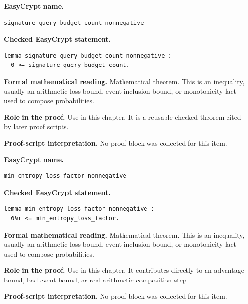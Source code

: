 \begin{formaltheorem}
\noindent\textbf{EasyCrypt name.}
\begin{lstlisting}[language=EasyCrypt,basicstyle=\ttfamily\scriptsize]
signature_query_budget_count_nonnegative
\end{lstlisting}
\noindent\textbf{Checked EasyCrypt statement.}
\begin{lstlisting}[language=EasyCrypt,basicstyle=\ttfamily\scriptsize]
lemma signature_query_budget_count_nonnegative :
  0 <= signature_query_budget_count.
\end{lstlisting}
\noindent\textbf{Formal mathematical reading.}
Mathematical theorem. This is an inequality, usually an arithmetic loss bound, event inclusion bound, or monotonicity fact used to compose probabilities.

\noindent\textbf{Role in the proof.}
Use in this chapter. It is a reusable checked theorem cited by later proof scripts.

\noindent\textbf{Proof-script interpretation.}
No proof block was collected for this item.

\end{formaltheorem}

\begin{formaltheorem}
\noindent\textbf{EasyCrypt name.}
\begin{lstlisting}[language=EasyCrypt,basicstyle=\ttfamily\scriptsize]
min_entropy_loss_factor_nonnegative
\end{lstlisting}
\noindent\textbf{Checked EasyCrypt statement.}
\begin{lstlisting}[language=EasyCrypt,basicstyle=\ttfamily\scriptsize]
lemma min_entropy_loss_factor_nonnegative :
  0%r <= min_entropy_loss_factor.
\end{lstlisting}
\noindent\textbf{Formal mathematical reading.}
Mathematical theorem. This is an inequality, usually an arithmetic loss bound, event inclusion bound, or monotonicity fact used to compose probabilities.

\noindent\textbf{Role in the proof.}
Use in this chapter. It contributes directly to an advantage bound, bad-event bound, or real-arithmetic composition step.

\noindent\textbf{Proof-script interpretation.}
No proof block was collected for this item.

\end{formaltheorem}


